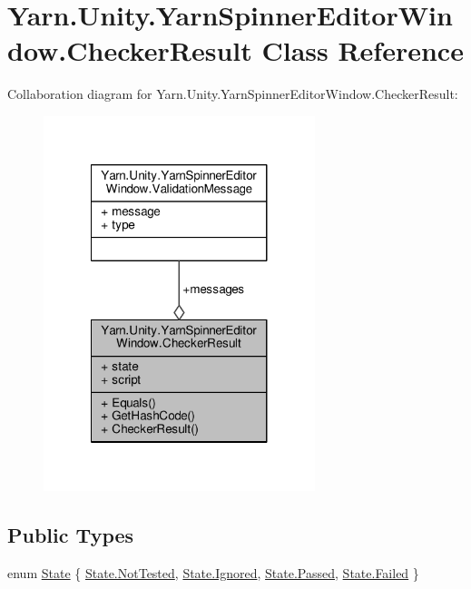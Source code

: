 \hypertarget{a00038}{\section{Yarn.\-Unity.\-Yarn\-Spinner\-Editor\-Window.\-Checker\-Result Class Reference}
\label{a00038}
}


Collaboration diagram for Yarn.\-Unity.\-Yarn\-Spinner\-Editor\-Window.\-Checker\-Result\-:
\nopagebreak
\begin{figure}[H]
\begin{center}
\leavevmode
\includegraphics[width=224pt]{a00363}
\end{center}
\end{figure}
\subsection*{Public Types}
\begin{DoxyCompactItemize}
\item 
enum \hyperlink{a00038_ab24848d7951ce44eb3c7768c6ee10385}{State} \{ \hyperlink{a00038_ab24848d7951ce44eb3c7768c6ee10385a0197c47523ba5a2bdfef705786687de5}{State.\-Not\-Tested}, 
\hyperlink{a00038_ab24848d7951ce44eb3c7768c6ee10385ad96143ba1b15645919cea00ec9d1be62}{State.\-Ignored}, 
\hyperlink{a00038_ab24848d7951ce44eb3c7768c6ee10385aa0d0628f6b4e4d78d2ffef4d4d1c4b15}{State.\-Passed}, 
\hyperlink{a00038_ab24848d7951ce44eb3c7768c6ee10385ad7c8c85bf79bbe1b7188497c32c3b0ca}{State.\-Failed}
 \}
\end{DoxyCompactItemize}
